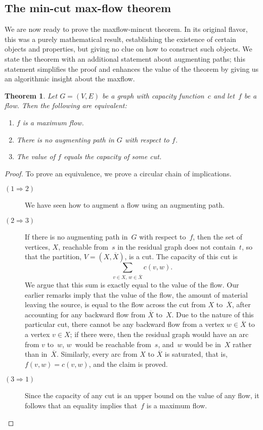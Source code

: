 \documentclass[11pt]{article}
\newtheorem{theorem}{Theorem}
\begin{document}
\subsection{The min-cut max-flow theorem}
We are now ready to prove the maxflow-mincut theorem.  In its original
flavor, this was a purely mathematical result, establishing the existence
of certain objects and properties, but giving no clue on how to construct
such objects.
We state the theorem with an additional statement about augmenting
paths; this statement simplifies the proof and enhances the value of
the theorem by giving us an algorithmic insight about the maxflow.
\begin{theorem}
  Let $G=(V,E)$ be a graph with capacity function~$c$
  and let~$f$ be a flow.  Then the following are equivalent:
  \begin{enumerate}
    \itemsep 0pt
    \item
      $f$ is a maximum flow.
    \item
      There is no augmenting path in $G$ with respect to $f$.
    \item
      The value of $f$ equals the capacity of some cut.
  \end{enumerate}
\end{theorem}
\begin{proof}
  To prove an equivalence, we prove a circular chain of implications.
\begin{description}
    \item[$(1 \Rightarrow 2)$]
      We have seen how to augment a flow using an augmenting path.
    \item[$(2 \Rightarrow 3)$]
      If there is no augmenting path in~$G$ with respect to~$f$,
      then the set of vertices, $X$, reachable from~$s$ in the
      residual graph does not contain~$t$, so that the partition,
      $V=(X,\overline{X})$, is a cut.  The capacity of this cut is
      \begin{displaymath}
        \sum_{v \in X,\,w \in \overline{X}} c(v,w).
      \end{displaymath}
      We argue that this sum is exactly equal to the value of the flow.  Our
      earlier remarks imply that the value of the flow, the amount of
      material leaving the source, is equal to the flow across the cut
      from $X$ to~$\overline{X}$, after accounting for any backward flow
      from $\overline{X}$ to~$X$.  Due to the nature of this particular
      cut, there cannot be any backward flow from a vertex $w \in \overline{X}$
      to a vertex $v \in X$; if there were, then the residual graph would have
      an arc from $v$ to~$w$, $w$~would be reachable from~$s$, and~$w$ would
      be in~$X$ rather than in~$\overline{X}$.
      Similarly, every arc from $X$ to $\overline{X}$ is saturated, that is,
      $f(v,w)=c(v,w)$, and the claim is proved.
    \item[$(3 \Rightarrow 1)$]
      Since the capacity of any cut is an upper bound on the value of any flow,
      it follows that an equality implies that~$f$ is a maximum flow.
  \end{description}
\end{proof}
\end{document}
